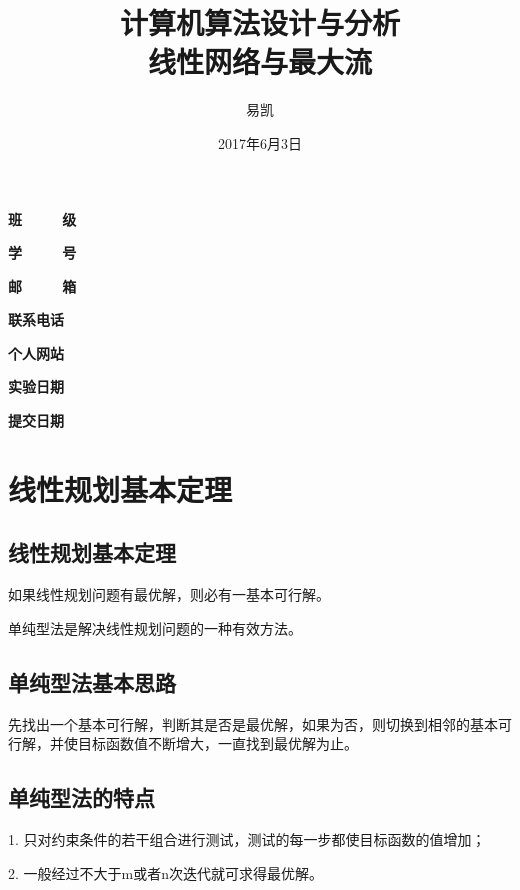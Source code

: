 \documentclass[UTF8]{ctexart}
\title{\Huge{计算机算法设计与分析\\ 线性网络与最大流}}
\author{\Huge{易凯}}
\date{\Huge{2017年6月3日}}
\begin{document}
    \maketitle
    \vspace{35mm}
    \begin{flushright}
    \Large{
    \textbf{班\ \ \ \ \ 级} 

    \textbf{学\ \ \ \ \ 号} 

    \textbf{邮\ \ \ \ \ 箱} 

    \textbf{联系电话} 

    \textbf{个人网站} 


      \textbf{实验日期} 

    \textbf{提交日期} 
    }
    \end{flushright}

    \newpage
  	\tableofcontents
  	\newpage
  	\listoffigures
    \newpage

    \section{线性规划基本定理}
    \subsection{线性规划基本定理}
    如果线性规划问题有最优解，则必有一基本可行解。

    单纯型法是解决线性规划问题的一种有效方法。

    \subsection{单纯型法基本思路}
    先找出一个基本可行解，判断其是否是最优解，如果为否，则切换到相邻的基本可行解，并使目标函数值不断增大，一直找到最优解为止。

    \subsection{单纯型法的特点}
    1. 只对约束条件的若干组合进行测试，测试的每一步都使目标函数的值增加；

    2. 一般经过不大于m或者n次迭代就可求得最优解。
\end{document}
